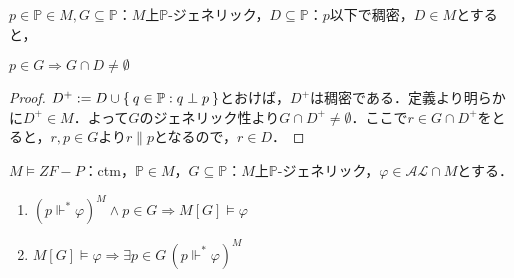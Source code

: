\documentclass[a4j]{bxjsarticle}
\theoremstyle{definition}
\begin{document}
\begin{lemma}\label{lem:below-dense-generic}
 $p \in \mathbb{P} \in M, G \subseteq \mathbb{P}$：$M$上$\mathbb{P}$-ジェネリック，$D \subseteq \mathbb{P}$：$p$以下で稠密，$D \in M$とすると，
 
 $p \in G \Rightarrow G \cap D \neq \emptyset$
\end{lemma}
\begin{proof}
 $D^+ \mathrel{:=} D \cup \Set{ q \in \mathbb{P} : q \perp p}$とおけば，$D^+$は稠密である．定義より明らかに$D^+ \in M$．よって$G$のジェネリック性より$G \cap D^+ \neq \emptyset$．ここで$r \in G \cap D^+$をとると，$r, p \in G$より$r \mathrel{\|} p$となるので，$r \in D$．\mbox{}
\end{proof}

\begin{lemma}\label{lem:atomic-forces-and-genexts}
 $M \models ZF-P$：ctm，$\mathbb{P} \in M$，$G \subseteq \mathbb{P}$：$M$上$\mathbb{P}$-ジェネリック，$\varphi \in \mathcal{AL} \cap M$とする．
 \begin{enumerate}[label=(\alph*)]
  \item $(p \mathrel{\Vdash^*} \varphi)^M \wedge p \in G\Rightarrow M[G] \models \varphi$
  \item $M[G] \models \varphi \Rightarrow \exists p \in G\, (p \mathrel{\Vdash^*} \varphi)^M$
 \end{enumerate}
\end{lemma}
\end{document}
